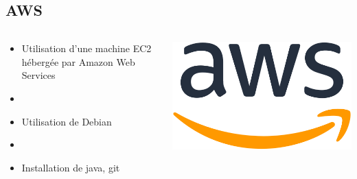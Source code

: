\documentclass[8pt,aspectratio=169,hyperref={unicode=true}]{beamer}
\begin{document}
\subsection{AWS}
\begin{frame}{\insertsubsection}
  \begin{columns}
    \begin{column}{.6\textwidth}
      \begin{itemize}
        \item Utilisation d'une machine EC2 hébergée par Amazon Web Services
        \item[]
        \item Utilisation de Debian
        \item[]
        \item Installation de java, git
      \end{itemize}
    \end{column}
    \begin{column}{.4\textwidth}
      \includegraphics[width=.8\textwidth]{./512px-Amazon_Web_Services_Logo.svg.png}
    \end{column}
  \end{columns}
\end{frame}
\end{document}
